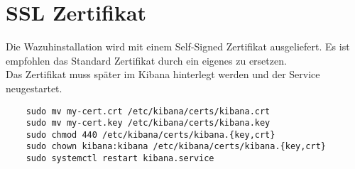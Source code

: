 \section{SSL Zertifikat}
Die Wazuhinstallation wird mit einem Self-Signed Zertifikat ausgeliefert.
Es ist empfohlen das Standard Zertifikat durch ein eigenes zu ersetzen.\\

Das Zertifikat muss später im Kibana hinterlegt werden und der Service neugestartet.

\begin{lstlisting}
    sudo mv my-cert.crt /etc/kibana/certs/kibana.crt
    sudo mv my-cert.key /etc/kibana/certs/kibana.key
    sudo chmod 440 /etc/kibana/certs/kibana.{key,crt}
    sudo chown kibana:kibana /etc/kibana/certs/kibana.{key,crt}
    sudo systemctl restart kibana.service
\end{lstlisting}